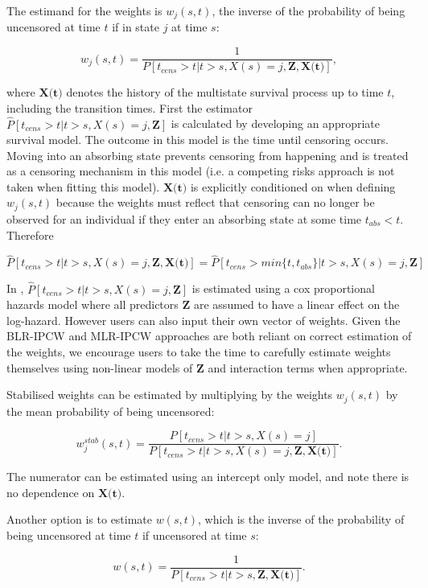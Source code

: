 \documentclass[article,shortnames]{jss}
\begin{document}
The estimand for the weights is $w_{j}(s,t)$, the inverse of the probability of being uncensored at time $t$ if in state $j$ at time $s$:

$$w_{j}(s,t) = \frac{1}{P[t_{cens} > t|t > s, X(s) = j, \textbf{Z},\textbf{X(t)}]},$$

where $\textbf{X(t)}$ denotes the history of the multistate survival process up to time $t$, including the transition times. First the estimator $\hat{P}[t_{cens} > t|t > s, X(s) = j, \textbf{Z}]$ is calculated by developing an appropriate survival model. The outcome in this model is the time until censoring occurs. Moving into an absorbing state prevents censoring from happening and is treated as a censoring mechanism in this model (i.e. a competing risks approach is not taken when fitting this model). $\textbf{X(t)}$ is explicitly conditioned on when defining $w_{j}(s,t)$ because the weights must reflect that censoring can no longer be observed for an individual if they enter an absorbing state at some time $t_{abs} < t$. Therefore

$$\hat{P}[t_{cens} > t|t > s, X(s) = j, \textbf{Z},\textbf{X(t)}] = \hat{P}[t_{cens} > min\{t,t_{abs}\}|t > s, X(s) = j, \textbf{Z}]$$

In , $\hat{P}[t_{cens} > t|t > s, X(s) = j, \textbf{Z}]$ is estimated using a cox proportional hazards model where all predictors $\textbf{Z}$ are assumed to have a linear effect on the log-hazard. However users can also input their own vector of weights. Given the BLR-IPCW and MLR-IPCW approaches are both reliant on correct estimation of the weights, we encourage users to take the time to carefully estimate weights themselves using non-linear models of $\textbf{Z}$ and interaction terms when appropriate.

Stabilised weights can be estimated by multiplying by the weights $w_{j}(s, t)$ by the mean probability of being uncensored:

$$w_{j}^{stab}(s, t) = \frac{P[t_{cens} > t|t > s, X(s) = j]}{P[t_{cens} > t|t > s, X(s) = j, \textbf{Z},\textbf{X(t)}]}.$$

The numerator can be estimated using an intercept only model, and note there is no dependence on $\textbf{X(t)}$.

Another option is to estimate $w(s,t)$, which is the inverse of the probability of being uncensored at time $t$ if uncensored at time $s$:

$$w(s,t) = \frac{1}{P[t_{cens} > t|t > s, \textbf{Z},\textbf{X(t)}]}.$$
\end{document}
